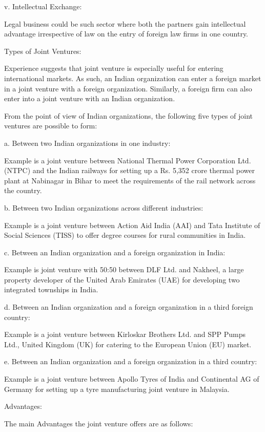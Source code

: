 \documentclass{article}
\begin{document}
v. Intellectual Exchange:

Legal business could be such sector where both the partners gain intellectual advantage irrespective of law on the entry of foreign
 law firms in one country.

Types of Joint Ventures:

Experience suggests that joint venture is especially useful for entering international markets. As such, an Indian organization 
can enter a foreign market in a joint venture with a foreign organization. Similarly, a foreign firm can also enter into a joint
 venture with an Indian organization.

From the point of view of Indian organizations, the following five types of joint ventures are possible to form:

a. Between two Indian organizations in one industry:

Example is a joint venture between National Thermal Power Corporation Ltd. (NTPC) and the Indian railways for setting up a Rs.
 5,352 crore thermal power plant at Nabinagar in Bihar to meet the requirements of the rail network across the country.

b. Between two Indian organizations across different industries:

Example is a joint venture between Action Aid India (AAI) and Tata Institute of Social Sciences (TISS) to offer degree courses for
 rural communities in India.

c. Between an Indian organization and a foreign organization in India:

Example is joint venture with 50:50 between DLF Ltd. and Nakheel, a large property developer of the United Arab Emirates (UAE) for
 developing two integrated townships in India.

d. Between an Indian organization and a foreign organization in a third foreign country:

Example is a joint venture between Kirloskar Brothers Ltd. and SPP Pumps Ltd., United Kingdom (UK) for catering to the European Union
 (EU) market.

e. Between an Indian organization and a foreign organization in a third country:

Example is a joint venture between Apollo Tyres of India and Continental AG of Germany for setting up a tyre manufacturing joint 
venture in Malaysia.

Advantages:

The main Advantages the joint venture offers are as follows:
\end{document}
